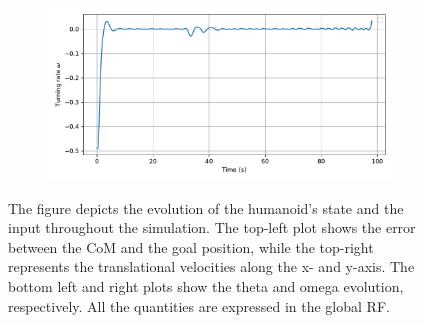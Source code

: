 \begin{figure}[h]
\begin{subfigure}{0.45\linewidth}
    \end{subfigure}
    \begin{subfigure}{0.45\linewidth}
        \centering
        \includegraphics[width=\linewidth]{figures/Simulations/sim1circles/evolution_3.pdf}
    \end{subfigure}
    \caption{The figure depicts the evolution of the humanoid's state and the input throughout the simulation. The top-left plot shows the error between the CoM and the goal position, while the top-right represents the translational velocities along the x- and y-axis. The bottom left and right plots show the theta and omega evolution, respectively. All the quantities are expressed in the global RF.}
    \label{fig:sim1_evol}
\end{figure}

